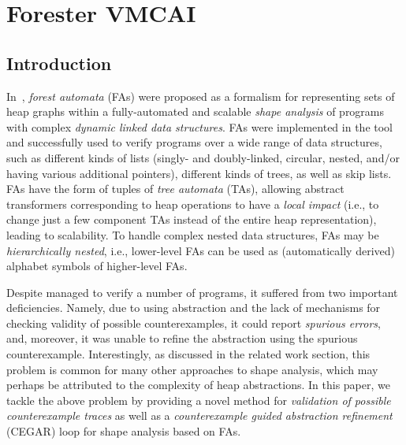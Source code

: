 {\chapter{Forester VMCAI}
\label{ch:vmcai}
\section{Introduction}\label{sec:label}

In~\cite{forester12,boxes13}, \emph{forest automata} (FAs) were proposed as a
formalism for representing sets of heap graphs within a fully-automated and
scalable \emph{shape analysis} of programs with complex \emph{dynamic linked
data structures}. FAs were implemented in the \forester{} tool and successfully
used to verify programs over a wide range of data structures, such as different
kinds of lists (singly- and doubly-linked, circular, nested, and/or having
various additional pointers), different kinds of trees, as well as skip lists.
FAs have the form of tuples of \emph{tree automata} (TAs), allowing abstract
transformers corresponding to heap operations to have a \emph{local impact}
(i.e., to change just a few component TAs instead of the entire heap
representation), leading to scalability. To handle complex nested data
structures, FAs may be \emph{hierarchically nested}, i.e., lower-level FAs can
be used as (automatically derived) alphabet symbols of higher-level FAs.

Despite \forester{} managed to verify a number of programs, it suffered from two
important deficiencies.
Namely, due to using abstraction and the lack of
mechanisms for checking validity of possible counterexamples, it could report
\emph{spurious errors}, and, moreover, it was unable to refine the abstraction
using the spurious counterexample.
Interestingly, as discussed in the related
work section, this problem is common for many other approaches to shape
analysis, which may perhaps be attributed to the complexity of heap
abstractions. In this paper, we tackle the above problem by providing a novel
method for \emph{validation of possible counterexample traces} as well as a
\emph{counterexample guided abstraction refinement} (CEGAR) loop for shape
analysis based on FAs.

}
